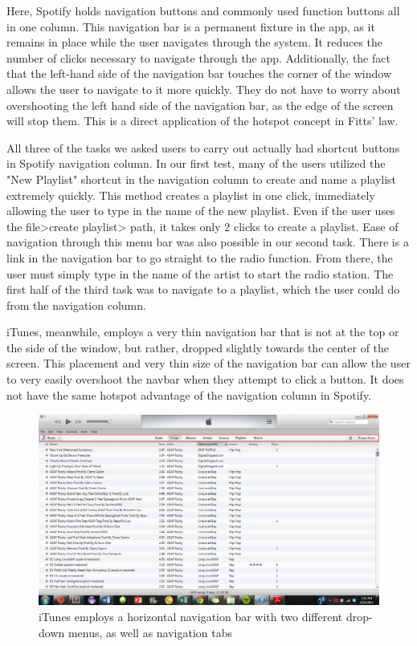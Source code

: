 \documentclass[12pt]{article}
\begin{document}
Here, Spotify holds navigation buttons and commonly used function 
buttons all in one column. This navigation bar is a permanent 
fixture in the app, as it remains in place while the user 
navigates through the system. It reduces the number of clicks 
necessary to navigate through the app. Additionally, the fact that 
the left-hand side of the navigation bar touches the corner of the 
window allows the user to navigate to it more quickly. They do not 
have to worry about overshooting the left hand side of the 
navigation bar, as the edge of the screen will stop them. This is 
a direct application of the hotspot concept in Fitts' law.

 All three of the tasks we asked users to carry out actually had 
shortcut buttons in Spotify navigation column. In our first 
test, many of the users utilized the "New Playlist" shortcut in 
the navigation column to create and name a playlist extremely 
quickly. This method creates a playlist in one click, immediately 
allowing the user to type in the name of the new playlist. Even if 
the user uses the file>create playlist> path, it takes only 2 
clicks to create a playlist. Ease of navigation through this menu 
bar was also possible in our second task. There is a link in the 
navigation bar to go straight to the radio function. From there, 
the user must simply type in the name of the artist to start the 
radio station. The first half of the third task was to navigate to 
a playlist, which the user could do from the navigation column.

iTunes, meanwhile, employs a very thin navigation bar that is not 
at the top or the side of the window, but rather, dropped slightly 
towards the center of the screen. This placement and very thin 
size of the navigation bar can allow the user to very easily 
overshoot the navbar when they attempt to click a button. It does 
not have the same hotspot advantage of the navigation column in 
Spotify.

\begin{figure}[H]
	\centering
	\includegraphics[width=\textwidth]{chart5.png}
	\caption{iTunes employs a horizontal navigation bar with 
two different drop-down menus, as well as navigation tabs}
\end{figure}
\end{document}
